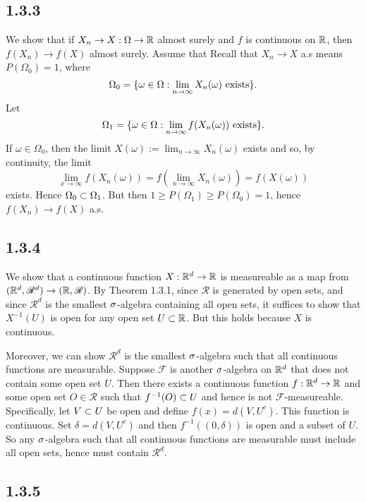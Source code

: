 \documentclass[11pt]{article}
\begin{document}
\subsection*{1.3.3}

We show that if $X_n \to X : \Omega \to {\mathbb R}$ almost surely and $f$ is continuous on ${\mathbb R}$, then $f(X_n) \to f(X)$ almost surely. Assume that Recall that $X_n \to X$ a.s means $P(\Omega_0) = 1$, where \[\Omega_0 = \{\omega \in \Omega: \lim_{n\to \infty} X_n(\omega) \text{ exists}\}.\] Let \[\Omega_1 =  \{\omega \in \Omega: \lim_{n\to \infty} f(X_n(\omega)) \text{ exists}\}.\] If $\omega \in \Omega_0$, then the limit $X(\omega) := \lim_{n\to \infty} X_n(\omega)$ exists and so, by continuity, the limit \[\lim_{x\to \infty } f(X_n(\omega)) = f(\lim_{n\to \infty} X_n(\omega)) = f(X(\omega))\] exists. Hence $\Omega_0 \subset \Omega_1$. But then $1 \geq P(\Omega_1) \geq P(\Omega_0) = 1$, hence $f(X_n) \to f(X)$ a.s.

\subsection*{1.3.4}

We show that a continuous function $X: {\mathbb R}^d \to {\mathbb R}$ is measureable as a map from $({\mathbb R}^d, \mathscr{R}^d)\to ({\mathbb R}, \mathscr{R})$. By Theorem 1.3.1, since $\mathscr{R}$ is generated by open sets, and since $\mathscr{R}^d$ is the smallest $\sigma$-algebra containing all open sets, it suffices to show that $X^{-1}(U)$ is open for any open set $U \subset {\mathbb R}$. But this holds because $X$ is continuous.

Moreover, we can show $\mathscr{R}^d$ is the smallest $\sigma$-algebra such that all continuous functions are measurable. Suppose $\mathscr{F}$ is another $\sigma$-algebra on ${\mathbb R}^d$ that does not contain some open set $U$. Then there exists a continuous function $f:{\mathbb R}^d \to {\mathbb R}$ and some open set $O \in \mathscr{R}$ such that $f^{-1}(O) \subset U$ and hence is not $\mathscr{F}$-measureable. Specifically, let $V \subset U$ be open and define $f(x) = d(V, U^c)$. This function is continuous. Set $\delta= d(V, U^c)$ and then $f^{-1}((0,\delta))$ is open and a subset of $U$. So any $\sigma$-algebra such that all continuous functions are measurable must include all open sets, hence must contain $\mathscr{R}^d$.

\subsection*{1.3.5}
\end{document}
